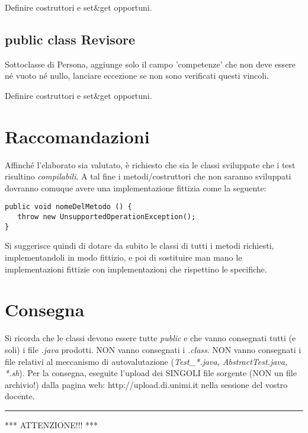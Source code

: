 \documentclass[a4paper]{article}
\begin{document}
Definire costruttori e set\&get opportuni.



\subsection*{public class Revisore}

Sottoclasse di Persona, aggiunge solo il campo 'competenze' che non deve essere 
né vuoto né nullo, lanciare eccezione se non sono verificati questi vincoli.

Definire costruttori e set\&get opportuni.



\section*{Raccomandazioni}

Affinché l'elaborato sia valutato, è richiesto che sia le classi sviluppate che i test risultino
\textit{compilabili}. A tal fine i metodi/costruttori che non saranno sviluppati dovranno comuque avere
una implementazione fittizia come la seguente:
\begin{verbatim}
public void nomeDelMetodo () {
   throw new UnsupportedOperationException();
}
\end{verbatim}
Si suggerisce quindi di dotare da subito le classi di tutti i metodi richiesti, 
implementandoli in modo fittizio, e poi di sostituire man mano le 
implementazioni fittizie con implementazioni che rispettino le specifiche.
 
\section*{Consegna}


Si ricorda che le classi devono essere tutte \textit{public} e che vanno 
consegnati tutti (e soli) i file \textit{.java} prodotti.
NON vanno consegnati i \textit{.class}.
NON vanno consegnati i file relativi al meccanismo di autovalutazione 
(\textit{Test\_*.java, AbstractTest.java, *.sh}).
Per la consegna, eseguite l'upload dei SINGOLI file sorgente (NON un file archivio!) dalla pagina web: http://upload.di.unimi.it
nella sessione del vostro docente.

\hrule
\medskip
\begin{center}*** ATTENZIONE!!! ***\end{center}
\end{document}

